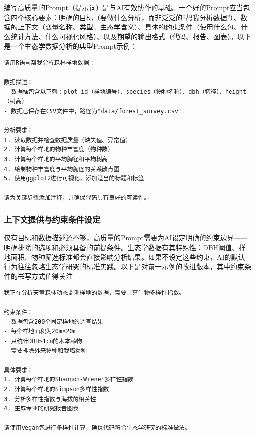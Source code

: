 \documentclass[
  twoside,12pt,fontset=none]{ctexbook}
\begin{document}
编写高质量的Prompt（提示词）是与AI有效协作的基础。一个好的Prompt应当包含四个核心要素：明确的目标（要做什么分析，而非泛泛的``帮我分析数据''）、数据的上下文（变量名称、类型、生态学含义）、具体的约束条件（使用什么包、什么统计方法、什么可视化风格）、以及期望的输出格式（代码、报告、图表）。以下是一个生态学数据分析的典型Prompt示例：

\begin{verbatim}
请用R语言帮我分析森林样地数据：

数据描述：
- 数据框包含以下列：plot_id（样地编号）、species（物种名称）、dbh（胸径）、height（树高）
- 数据已保存在CSV文件中，路径为"data/forest_survey.csv"

分析要求：
1. 读取数据并检查数据质量（缺失值、异常值）
2. 计算每个样地的物种丰富度（物种数）
3. 计算每个样地的平均胸径和平均树高
4. 绘制物种丰富度与平均胸径的关系散点图
5. 使用ggplot2进行可视化，添加适当的标题和标签

请为关键步骤添加注释，并确保代码具有良好的可读性。
\end{verbatim}

\hypertarget{ux4e0aux4e0bux6587ux63d0ux4f9bux4e0eux7ea6ux675fux6761ux4ef6ux8bbeux5b9a}{%
\subsubsection{上下文提供与约束条件设定}\label{ux4e0aux4e0bux6587ux63d0ux4f9bux4e0eux7ea6ux675fux6761ux4ef6ux8bbeux5b9a}}

仅有目标和数据描述还不够，高质量的Prompt需要为AI设定明确的约束边界------明确排除的选项和必须具备的前提条件。生态学数据有其特殊性：DBH阈值、样地面积、物种筛选标准都会直接影响分析结果。如果不设定这些约束，AI的默认行为往往忽略生态学研究的标准实践。以下是对前一示例的改进版本，其中约束条件的书写方式值得关注：

\begin{verbatim}
我正在分析天童森林动态监测样地的数据，需要计算生物多样性指数。

约束条件：
- 数据包含200个固定样地的调查结果
- 每个样地面积为20m×20m
- 只统计DBH≥1cm的木本植物
- 需要排除外来物种和栽培物种

具体要求：
1. 计算每个样地的Shannon-Wiener多样性指数
2. 计算每个样地的Simpson多样性指数
3. 分析多样性指数与海拔的相关性
4. 生成专业的研究报告图表

请使用vegan包进行多样性计算，确保代码符合生态学研究的标准做法。
\end{verbatim}
\end{document}
